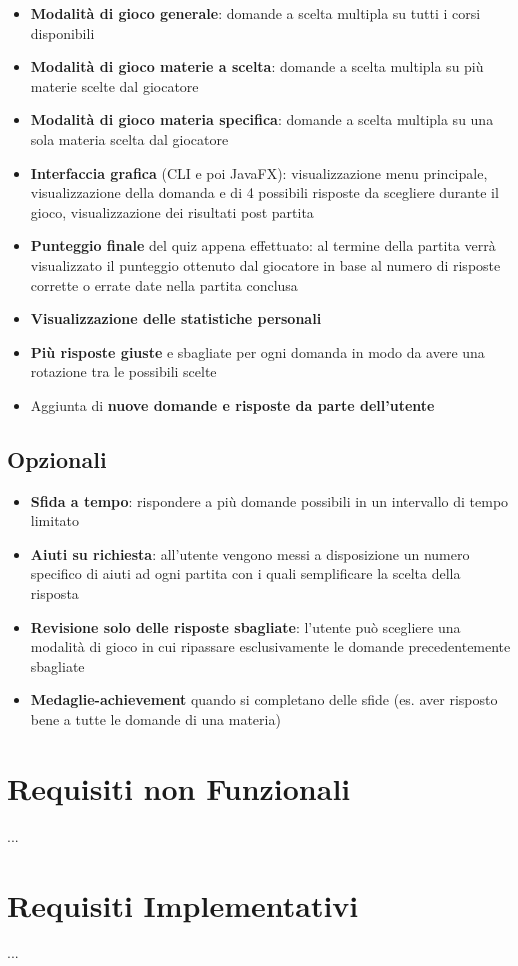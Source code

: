         \begin{itemize}
            \item \textbf{Modalità di gioco generale}: domande a scelta multipla su tutti i corsi disponibili
            
            \item \textbf{Modalità di gioco materie a scelta}: domande a scelta multipla su più materie scelte dal giocatore
            
            \item \textbf{Modalità di gioco materia specifica}: domande a scelta multipla su una sola materia scelta dal giocatore
            
            \item \textbf{Interfaccia grafica} (CLI e poi JavaFX): visualizzazione menu principale, visualizzazione della domanda e di 4 possibili risposte da scegliere durante il gioco, visualizzazione dei risultati post partita
            
            \item \textbf{Punteggio finale} del quiz appena effettuato: al termine della partita verrà visualizzato il punteggio ottenuto dal giocatore in base al numero di risposte corrette o errate date nella partita conclusa
            
            \item \textbf{Visualizzazione delle statistiche personali}
            
            \item \textbf{Più risposte giuste} e sbagliate per ogni domanda in modo da avere una rotazione tra le possibili scelte
            
            \item Aggiunta di \textbf{nuove domande e risposte da parte dell’utente}
        \end{itemize}  

    
        \subsection{Opzionali}
        \begin{itemize}
            \item \textbf{Sfida a tempo}: rispondere a più domande possibili in un intervallo di tempo limitato
            \item \textbf{Aiuti su richiesta}: all’utente vengono messi a disposizione un numero specifico di aiuti ad ogni partita con i quali semplificare la scelta della risposta
            \item \textbf{Revisione solo delle risposte sbagliate}: l’utente può scegliere una modalità di gioco in cui ripassare esclusivamente le domande precedentemente sbagliate
            \item \textbf{Medaglie-achievement} quando si completano delle sfide (es. aver risposto bene a tutte le domande di una materia)
        \end{itemize}
	\section{Requisiti non Funzionali}
	...

	\section{Requisiti Implementativi}
	...